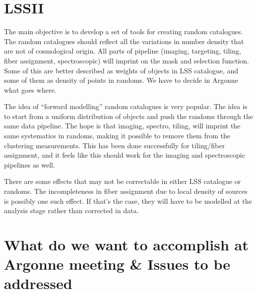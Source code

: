 \documentclass[11pt]{article}
\begin{document}
\section{LSSII}

The main objective is to develop a set of tools for creating random catalogues.
The random catalogues should reflect all the variations in number density that
are not of cosmological origin. All parts of pipeline (imaging, targeting,
tiling, fiber assignment, spectroscopic) will imprint on the mask and selection
function. Some of this are better described as weights of objects in LSS
catalogue, and some of them as density of points in randoms. We have to decide
in Argonne what goes where. 

The idea of ``forward modelling'' random catalogues is very popular. The idea is
to start from a uniform distribution of objects and push the randoms through the
same data pipeline. The hope is that imaging, spectro, tiling, will imprint the
same systematics in randoms, making it possible to remove them from the
clustering measurements. This has been done successfully for tiling/fiber
assignment, and it feels like this should work for the imaging and spectroscopic
pipelines as well.

There are some effects that may not be correctable in either LSS catalogue or
randoms. The incompleteness in fiber assignment due to local density of sources
is possibly one such effect. If that's the case, they will have to be modelled
at the analysis stage rather than corrected in data.

\section{What do we want to accomplish at Argonne meeting \& Issues to be
addressed}
\end{document}
